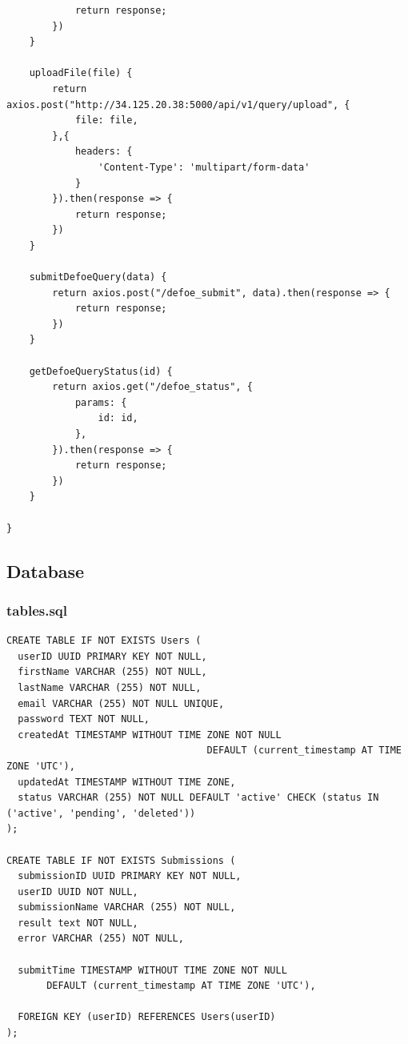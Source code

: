 \documentclass[12pt, letterpaper]{article}
\begin{document}
\begin{verbatim}
            return response;
        })
    }

    uploadFile(file) {
        return axios.post("http://34.125.20.38:5000/api/v1/query/upload", {
            file: file,
        },{
            headers: {
                'Content-Type': 'multipart/form-data'
            }
        }).then(response => {
            return response;
        })
    }

    submitDefoeQuery(data) {
        return axios.post("/defoe_submit", data).then(response => {
            return response;
        })
    }

    getDefoeQueryStatus(id) {
        return axios.get("/defoe_status", {
            params: {
                id: id,
            },
        }).then(response => {
            return response;
        })
    }

}
\end{verbatim}

\subsection{Database}
\subsubsection{tables.sql}\label{appendix:tables.sql}

\begin{verbatim}
CREATE TABLE IF NOT EXISTS Users (
  userID UUID PRIMARY KEY NOT NULL,
  firstName VARCHAR (255) NOT NULL,
  lastName VARCHAR (255) NOT NULL,
  email VARCHAR (255) NOT NULL UNIQUE,
  password TEXT NOT NULL,
  createdAt TIMESTAMP WITHOUT TIME ZONE NOT NULL
                                   DEFAULT (current_timestamp AT TIME ZONE 'UTC'),
  updatedAt TIMESTAMP WITHOUT TIME ZONE,
  status VARCHAR (255) NOT NULL DEFAULT 'active' CHECK (status IN ('active', 'pending', 'deleted'))
);

CREATE TABLE IF NOT EXISTS Submissions (
  submissionID UUID PRIMARY KEY NOT NULL,
  userID UUID NOT NULL,
  submissionName VARCHAR (255) NOT NULL,
  result text NOT NULL,
  error VARCHAR (255) NOT NULL,

  submitTime TIMESTAMP WITHOUT TIME ZONE NOT NULL
       DEFAULT (current_timestamp AT TIME ZONE 'UTC'),

  FOREIGN KEY (userID) REFERENCES Users(userID)
);
\end{verbatim}
\end{document}
